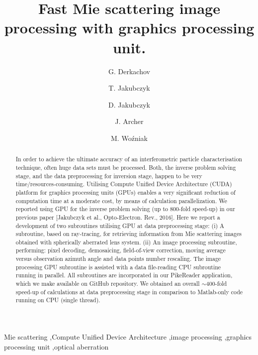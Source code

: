 \documentclass[preprint,review,12pt,dvips]{elsarticle}
\begin{document}
\begin{frontmatter}
\title{Fast Mie scattering image processing with graphics processing unit.}
\author[ifpan]{G. Derkachov}
\author[iccm]{T. Jakubczyk}
\author[ifpan]{D. Jakubczyk}
\author[ifpan]{J. Archer}
\author[ifpan]{M. {Wo\'{z}niak}}

\address[ifpan]{Institute of Physics, Polish Academy of Sciences,
Aleja~{Lotnik\'{o}w} 32/46, PL-02668 Warsaw, Poland}
\address[iccm]{Institute of Control and Computation Engineering, Warsaw University of Technology,
ul.~Nowowiejska 15/19, PL-00665 Warsaw, Poland} 

\begin{abstract}
In order to achieve the ultimate accuracy of an interferometric particle characterisation technique, often huge data sets
must be processed. Both, the inverse problem solving stage, and the data preprocessing for inversion stage, happen to be
very time/resources-consuming. Utilising Compute Unified Device Architecture (CUDA) platform for graphics processing units
(GPUs) enables a very significant reduction of computation time at a moderate cost, by means of calculation
parallelization. We reported using GPU for the inverse problem solving (up to 800-fold speed-up) in our previous paper
[Jakubczyk et al., Opto-Electron. Rev., 2016]. Here we report a development of two subroutines utilising GPU at data
preprocessing stage: (i) A subroutine, based on ray-tracing, for retrieving information from Mie scattering images
obtained with spherically aberrated lens system. (ii) An image processing subroutine, performing: pixel decoding,
demosaicing, field-of-view correction, moving average versus observation azimuth angle and data points number rescaling.
The image processing GPU subroutine is assisted with a data file-reading CPU subroutine running in parallel. All
subroutines are incorporated in our PikeReader application, which we make available on GitHub repository. We obtained an
overall $\sim 400$-fold speed-up of calculations at data preprocessing stage in comparison to Matlab-only code running on
CPU (single thread).
\end{abstract}

\begin{keyword}
Mie scattering \sep Compute Unified Device Architecture \sep image processing \sep graphics processing unit \sep optical
aberration
\end{keyword}
\end{frontmatter}
\end{document}
